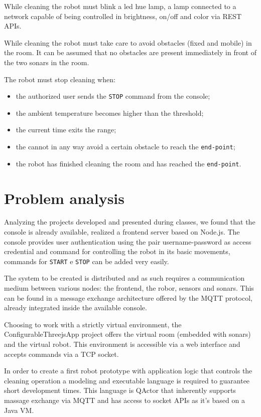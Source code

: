 While cleaning the robot must blink a led hue lamp, a lamp connected to a network capable of being controlled in brightness, on/off and color via REST APIs.

While cleaning the robot must take care to avoid obstacles (fixed and mobile) in the room. It can be assumed that no obstacles are present immediately in front of the two sonars in the room.

The robot must stop cleaning when:
\begin{itemize}
\item the authorized user sends the \texttt{STOP} command from the console;
\item the ambient temperature becomes higher than the threshold;
\item the current time exits the range;
\item the cannot in any way avoid a certain obstacle to reach the \texttt{end-point};
\item the robot has finished cleaning the room and has reached the \texttt{end-point}.
\end{itemize}

\section{Problem analysis}
Analyzing the projects developed and presented during classes, we found that the console is already available, realized a frontend server based on Node.js. The console provides user authentication using the pair username-password as access credential and command for controlling the robot in its basic movements, commands for \texttt{START} e \texttt{STOP} can be added very easily.

The system to be created is distributed and as such requires a communication medium between various nodes: the frontend, the robor, sensors and sonars. This can be found in a message exchange architecture offered by the MQTT protocol, already integrated inside the available console.

Choosing to work with a strictly virtual environment, the ConfigurableThreejsApp project offers the virtual room (embedded with sonars) and the virtual robot. This environment is accessible via a web interface and accepts commands via a TCP socket.

In order to create a first robot prototype with application logic that controls the cleaning operation a modeling and executable language is required to guarantee short development times. This language is QActor that inherently supports massage exchange via MQTT and has access to socket APIs as it's based on a Java VM.

